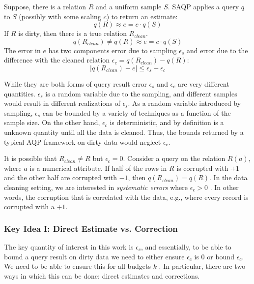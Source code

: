 Suppose, there is a relation $R$ and a uniform sample $S$.
SAQP applies a query $q$ to $S$ (possibly with some scaling $c$) to return an estimate: 
\[
q(R) \approx e = c \cdot q(S)
\]
If $R$ is dirty, then there is a true relation $R_{clean}$.
\[
q(R_{clean}) \ne q(R) \approx e = c \cdot q(S)
\]
The error in $e$ has two components error due to sampling $\epsilon_s$ and error due to the difference with the cleaned relation $\epsilon_c = q(R_{clean}) - q(R)$:
\[
\mid q(R_{clean}) - e \mid \le \epsilon_s + \epsilon_c
\]

While they are both forms of query result error $\epsilon_s$ and $\epsilon_c$ are very different quantities.
$\epsilon_s$ is a random variable due to the sampling, and different samples would result in different realizations of $\epsilon_s$.
As a random variable introduced by sampling, $\epsilon_s$ can be bounded by a variety of techniques as a function of the sample size.
On the other hand, $\epsilon_c$ is deterministic, and by definition is a unknown quantity until all the data is cleaned.
Thus, the bounds returned by a typical AQP framework on dirty data would neglect $\epsilon_c$.

It is possible that $R_{clean} \ne R$ but $\epsilon_c=0$.
Consider a \sumfunc query on the relation $R(a)$, where $a$ is a numerical attribute.
If half of the rows in $R$ is corrupted with $+1$ and the other half are corrupted with $-1$, then $q(R_{clean}) = q(R)$.
In the data cleaning setting, we are interested in \emph{systematic errors} where $\epsilon_c > 0$ \cite{taylor1982introduction}. 
In other words, the corruption that is correlated with the data, e.g., where every record is corrupted with a $+1$.

\subsubsection{Key Idea I: Direct Estimate vs. Correction}
The key quantity of interest in this work is $\epsilon_c$, and essentially, to be able to bound
a query result on dirty data we need to either ensure $\epsilon_c$ is 0 or bound $\epsilon_c$.
We need to be able to ensure this for all budgets $k$ .
In particular, there are two ways in which this can be done: direct estimates and corrections.

